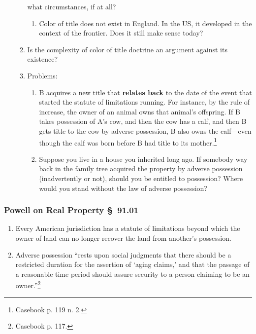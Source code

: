 \begin{enumerate}
\begin{enumerate}
        what circumstances, if at all?
        \begin{enumerate}
            \item Color of title does not exist in England. In the US, it 
            developed in the context of the frontier. Does it still make sense 
            today?
        \end{enumerate}
        \item Is the complexity of color of title doctrine an argument against 
        its existence?
        \item Problems:
        \begin{enumerate}
            \item B acquires a new title that \textbf{relates back} to the date of 
            the event that started the statute of limitations running. For 
            instance, by the rule of increase, the owner of an animal owns that 
            animal's offspring. If B takes possession of A's cow, and then the 
            cow has a calf, and then B  gets title to the cow by adverse 
            possession, B also owns the calf---even though the calf was born 
            before B had title to its mother.\footnote{Casebook p. 119 n. 2.}
            \item Suppose you live in a house you inherited long ago. If somebody 
            way back in the family tree acquired the property by adverse 
            possession (inadvertently or not), should you be entitled to 
            possession? Where would you stand without the law of adverse 
            possession?
        \end{enumerate}
    \end{enumerate}
\end{enumerate}

\subsubsection{Powell on Real Property \S\ 91.01}

\begin{enumerate}
    \item Every American jurisdiction has a statute of limitations beyond 
    which the owner of land can no longer recover the land from another's 
    possession.
    \item Adverse possession ``rests upon social judgments that there should 
    be a restricted duration for the assertion of `aging claims,' and that the 
    passage of a reasonable time period should assure security to a person 
    claiming to be an owner.''\footnote{Casebook p. 117.}
\end{enumerate}

